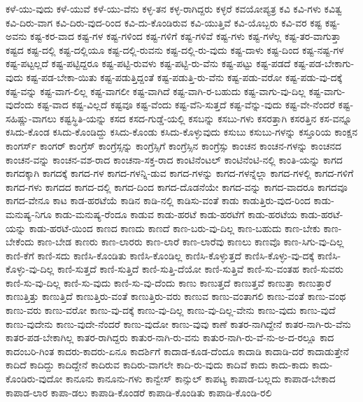 {ಕಳೆ-ಯು-ವುದು
ಕಳೆ-ಯುವೆ
ಕಳೆ-ಯು-ವೆನು
ಕಳ್ಳ-ತನ
ಕಳ್ಳ-ರಾಗಿದ್ದರು
ಕಳ್ಳರೆ
ಕವಯೋಪ್ಯತ್ರ
ಕವಿ
ಕವಿ-ಗಳು
ಕವಿತ್ವ
ಕವಿ-ದಿರು-ವಾಗ
ಕವಿ-ದಿರು-ವುದ-ರಿಂದ
ಕವಿ-ದು-ಕೊಂಡಿರುವ
ಕವಿ-ಯುತ್ತಿವೆ
ಕವಿ-ಯೊಬ್ಬರು
ಕವಿ-ವರ
ಕಷ್ಟ
ಕಷ್ಟ-ಅವನು
ಕಷ್ಟ-ಕರ-ವಾದ
ಕಷ್ಟ-ಗಳ
ಕಷ್ಟ-ಗಳಿಂದ
ಕಷ್ಟ-ಗಳಿಗೆ
ಕಷ್ಟ-ಗಳಿವೆ
ಕಷ್ಟ-ಗಳು
ಕಷ್ಟ-ಗಳೆಲ್ಲ
ಕಷ್ಟ-ತರ-ವಾಗುತ್ತಾ
ಕಷ್ಟದ
ಕಷ್ಟ-ದಲ್ಲಿ
ಕಷ್ಟ-ದಲ್ಲಿಯೂ
ಕಷ್ಟ-ದಲ್ಲಿ-ರುವನು
ಕಷ್ಟ-ದಲ್ಲಿ-ರು-ವುದು
ಕಷ್ಟ-ದಾಳು
ಕಷ್ಟ-ದಿಂದ
ಕಷ್ಟ-ನಷ್ಟ-ಗಳ
ಕಷ್ಟ-ಪಟ್ಟಲ್ಲದೆ
ಕಷ್ಟ-ಪಟ್ಟಿದ್ದರೂ
ಕಷ್ಟ-ಪಟ್ಟಿ-ರುವಳು
ಕಷ್ಟ-ಪಟ್ಟಿ-ರು-ವೆನು
ಕಷ್ಟ-ಪಟ್ಟು
ಕಷ್ಟ-ಪಡದೆ
ಕಷ್ಟ-ಪಡ-ಬೇಕಾಗು-ವುದು
ಕಷ್ಟ-ಪಡ-ಬೇಕಾ-ಯಿತು
ಕಷ್ಟ-ಪಡುತ್ತಿದ್ದಂತೆ
ಕಷ್ಟ-ಪಡುತ್ತಿ-ರು-ವೆನು
ಕಷ್ಟ-ಪಡು-ವರೋ
ಕಷ್ಟ-ಪಡು-ವು-ದಕ್ಕೆ
ಕಷ್ಟ-ವನ್ನು
ಕಷ್ಟ-ವಾಗ-ಲಿಲ್ಲ
ಕಷ್ಟ-ವಾಗಲೀ
ಕಷ್ಟ-ವಾಗಿದೆ
ಕಷ್ಟ-ವಾಗಿ-ರ-ಬಹುದು
ಕಷ್ಟ-ವಾಗು-ವು-ದಿಲ್ಲ
ಕಷ್ಟ-ವಾಗು-ವುದೆಂದು
ಕಷ್ಟ-ವಾದ
ಕಷ್ಟ-ವಿಲ್ಲದೆ
ಕಷ್ಟವೂ
ಕಷ್ಟ-ವೆಂದು
ಕಷ್ಟ-ವೆನಿ-ಸುತ್ತದೆ
ಕಷ್ಟ-ವೆನ್ನು-ವುದು
ಕಷ್ಟ-ವೇ-ನೆಂದರೆ
ಕಷ್ಟ-ಸಹಿಷ್ಣು-ವಾಗಲು
ಕಷ್ಟಸ್ಥಿತಿ-ಯನ್ನು
ಕಸದ
ಕಸದ-ಗುಡ್ಡೆ-ಯಲ್ಲಿ
ಕಸಬನ್ನು
ಕಸಬು-ಗಳು
ಕಸರತ್ತಾಗಿ
ಕಸರತ್ತಿನ
ಕಸ-ವನ್ನೂ
ಕಸಿದು-ಕೊಂಡ
ಕಸಿದು-ಕೊಂಡಿದ್ದು
ಕಸಿದು-ಕೊಂಡು
ಕಸಿದು-ಕೊಳ್ಳುವುದು
ಕಸುಬು
ಕಸುಬು-ಗಳನ್ನು
ಕಸ್ತೂರಿಯ
ಕಾಂಕ್ಷನ
ಕಾಂಗರ್ಸ್
ಕಾಂಗರ್
ಕಾಂಗ್ರೆಸ್
ಕಾಂಗ್ರೆಸ್ಸನ್ನು
ಕಾಂಗ್ರೆಸ್ಸಿಗೆ
ಕಾಂಗ್ರೆಸ್ಸಿನ
ಕಾಂಗ್ರೆಸ್ಸು
ಕಾಂಚನ
ಕಾಂಚನ-ಗಳನ್ನು
ಕಾಂಚನದ
ಕಾಂಚನ-ವನ್ನು
ಕಾಂಚನ-ವಶ-ರಾದ
ಕಾಂಚನಾ-ಸಕ್ತ-ರಾದ
ಕಾಂಟಿನೆಂಟಲ್
ಕಾಂಟಿನೆಂಟಿ-ನಲ್ಲಿ
ಕಾಂತಿ-ಯನ್ನು
ಕಾಗದ
ಕಾಗದಕ್ಕಾಗಿ
ಕಾಗದಕ್ಕೆ
ಕಾಗದ-ಗಳ
ಕಾಗದ-ಗಳನ್ನಿ-ಡುವ
ಕಾಗದ-ಗಳನ್ನು
ಕಾಗದ-ಗಳನ್ನೆಲ್ಲಾ
ಕಾಗದ-ಗಳಲ್ಲಿ
ಕಾಗದ-ಗಳಿಗೆ
ಕಾಗದ-ಗಳು
ಕಾಗದದ
ಕಾಗದ-ದಲ್ಲಿ
ಕಾಗದ-ದಿಂದ
ಕಾಗದ-ದೊಡನೆಯೇ
ಕಾಗದ-ವನ್ನು
ಕಾಗದ-ವಾದರೂ
ಕಾಗದವೂ
ಕಾಗದ-ವೇನೂ
ಕಾಟ
ಕಾಡ-ಹರಟೆಯೆ
ಕಾಡಿನ
ಕಾಡಿ-ನಲ್ಲಿ
ಕಾಡಿಸು-ವಂತೆ
ಕಾಡು
ಕಾಡುತ್ತಿರು-ವುದ-ರಿಂದ
ಕಾಡು-ಮನುಷ್ಯ-ನಿಗೂ
ಕಾಡು-ಮನುಷ್ಯ-ರೆಂದೂ
ಕಾಡುವ
ಕಾಡು-ಹರಟೆ
ಕಾಡು-ಹರಟೆಗೆ
ಕಾಡು-ಹರಟೆಯ
ಕಾಡು-ಹರಟೆ-ಯನ್ನು
ಕಾಡು-ಹರಟೆ-ಯಿಂದ
ಕಾಣದ
ಕಾಣದು
ಕಾಣದೆ
ಕಾಣ-ಬರು-ವು-ದಿಲ್ಲ
ಕಾಣ-ಬಹುದು
ಕಾಣ-ಬೇಕು
ಕಾಣ-ಬೇಕೆಂದು
ಕಾಣ-ಬೇಡ
ಕಾಣರು
ಕಾಣ-ಲಾರರು
ಕಾಣ-ಲಾರೆ
ಕಾಣ-ಲಾರೆವು
ಕಾಣಲು
ಕಾಣವೊ
ಕಾಣ-ಸಿಗು-ವು-ದಿಲ್ಲ
ಕಾಣಿ-ಕೆಗೆ
ಕಾಣಿ-ಸದು
ಕಾಣಿಸಿ-ಕೊಂಡಿತು
ಕಾಣಿಸಿ-ಕೊಂಡಿಲ್ಲ
ಕಾಣಿಸಿ-ಕೊಳ್ಳುತ್ತದೆ
ಕಾಣಿಸಿ-ಕೊಳ್ಳು-ವು-ದಕ್ಕೆ
ಕಾಣಿಸಿ-ಕೊಳ್ಳು-ವು-ದಿಲ್ಲ
ಕಾಣಿ-ಸುತ್ತದೆ
ಕಾಣಿ-ಸುತ್ತಿದೆ
ಕಾಣಿ-ಸುತ್ತಿ-ದೆಯೋ
ಕಾಣಿ-ಸುತ್ತಿವೆ
ಕಾಣಿ-ಸು-ವಂತಹ
ಕಾಣಿ-ಸುವರು
ಕಾಣಿ-ಸು-ವು-ದಿಲ್ಲ
ಕಾಣಿ-ಸು-ವುದು
ಕಾಣಿ-ಸು-ವು-ದೆಂದು
ಕಾಣು
ಕಾಣುತ್ತದೆ
ಕಾಣುತ್ತವೆ
ಕಾಣುತ್ತಾ
ಕಾಣುತ್ತಾರೆ
ಕಾಣುತ್ತಿತ್ತು
ಕಾಣುತ್ತಿದೆ
ಕಾಣುತ್ತಿರು-ವಂತೆ
ಕಾಣುತ್ತಿರು-ವರು
ಕಾಣುವ
ಕಾಣು-ವಂತಾಗಲಿ
ಕಾಣು-ವಂತೆ
ಕಾಣು-ವಂಥ
ಕಾಣು-ವರು
ಕಾಣು-ವರೋ
ಕಾಣು-ವು-ದಕ್ಕೆ
ಕಾಣು-ವು-ದಿಲ್ಲ
ಕಾಣು-ವು-ದಿಲ್ಲ-ವೇನು
ಕಾಣು-ವುದು
ಕಾಣು-ವುದೆ
ಕಾಣು-ವುದೇನು
ಕಾಣು-ವುದೇ-ನೆಂದರೆ
ಕಾಣು-ವುದೋ
ಕಾಣು-ವುವು
ಕಾಣೆ
ಕಾತರ-ನಾಗಿದ್ದೇನೆ
ಕಾತರ-ನಾಗಿ-ರು-ವೆನು
ಕಾತರ-ಪಡ-ಬೇಕಾಗಿಲ್ಲ
ಕಾತರ-ರಾಗಿದ್ದರು
ಕಾತುರ-ನಾಗಿ-ರು-ವನು
ಕಾತುರ-ನಾಗಿ-ರು-ವೆ-ನು-ಅ-ದ-ರಲ್ಲೂ
ಕಾದ
ಕಾದಂಬರಿ-ಗಿಂತ
ಕಾದರು-ಕಾದರು-ಏನೂ
ಕಾದರ್ಶಿಗೆ
ಕಾದಾಡ-ಕೂಡ-ದೆಂದೂ
ಕಾದಾಡಿ
ಕಾದಾಡಿ-ದರೆ
ಕಾದಾಡುತ್ತೇನೆ
ಕಾದಿದೆ
ಕಾದಿದ್ದು
ಕಾದಿದ್ದೇನೆ
ಕಾದಿರುವ
ಕಾದಿರು-ವಾಗಲೇ
ಕಾದಿ-ರು-ವುದು
ಕಾದಿವೆ
ಕಾದು
ಕಾದು-ಕಾದು
ಕಾದು-ಕೊಂಡಿರು-ವುದೋ
ಕಾನೂನು
ಕಾನೂನು-ಗಳು
ಕಾನ್ವೇಸ್
ಕಾನ್ಸುಲ್
ಕಾಪಟ್ಯ
ಕಾಪಾಡ-ಬಲ್ಲದು
ಕಾಪಾಡ-ಬೇಕಾದ
ಕಾಪಾಡ-ಲಾರ
ಕಾಪಾ-ಡಲು
ಕಾಪಾಡಿ-ಕೊಂಡರೆ
ಕಾಪಾಡಿ-ಕೊಂಡಿತು
ಕಾಪಾಡಿ-ಕೊಂಡಿ-ರಲಿ
}
